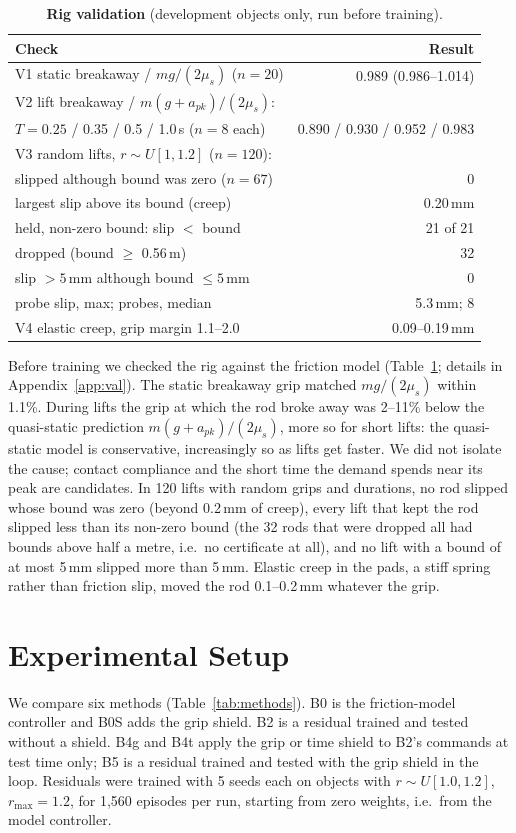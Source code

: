 \begin{table}[t]\centering\footnotesize
\caption{\textbf{Rig validation} (development objects only, run before training).}\label{tab:val}
\setlength{\tabcolsep}{3pt}
\begin{tabular}{@{}lr@{}}\toprule
Check & Result\\\midrule
V1 static breakaway / $mg/(2\mu_s)$ ($n=20$) & 0.989 (0.986--1.014)\\
V2 lift breakaway / $m(g+a_{pk})/(2\mu_s)$:&\\
\quad $T=0.25$ / 0.35 / 0.5 / 1.0\,s ($n=8$ each) & 0.890 / 0.930 / 0.952 / 0.983\\
V3 random lifts, $r\sim U[1,1.2]$ ($n=120$):&\\
\quad slipped although bound was zero ($n=67$) & 0\\
\quad largest slip above its bound (creep) & 0.20\,mm\\
\quad held, non-zero bound: slip $<$ bound & 21 of 21\\
\quad dropped (bound $\ge$ 0.56\,m) & 32\\
\quad slip $>5$\,mm although bound $\le5$\,mm & 0\\
\quad probe slip, max; probes, median & 5.3\,mm; 8\\
V4 elastic creep, grip margin 1.1--2.0 & 0.09--0.19\,mm\\\bottomrule
\end{tabular}\end{table}

 Before training we checked the rig against the friction model (Table~\ref{tab:val}; details in
Appendix~\ref{app:val}). The static breakaway grip matched $mg/(2\mu_s)$ within 1.1\%. During lifts the grip at which the rod
broke away was 2--11\% below the quasi-static prediction $m(g+a_{pk})/(2\mu_s)$, more so for short lifts: the quasi-static
model is conservative, increasingly so as lifts get faster. We did not isolate the cause; contact compliance and the
short time the demand spends near its peak are candidates. In
120 lifts with random grips and durations, no rod slipped whose bound was zero (beyond 0.2\,mm of creep), every lift that kept the
rod slipped less than its non-zero bound (the 32 rods that were dropped all had bounds above half a metre, i.e.\ no
certificate at all), and no lift with a bound of at most 5\,mm slipped more than 5\,mm. Elastic creep in the pads, a stiff
spring rather than friction slip, moved the rod 0.1--0.2\,mm whatever the grip.

\section{Experimental Setup}\label{sec:setup}
 We compare six methods (Table~\ref{tab:methods}). B0 is the friction-model controller and B0S adds the
grip shield. B2 is a residual trained and tested without a shield. B4g and B4t apply the grip or time shield to B2's
commands at test time only; B5 is a residual trained and tested with the grip shield in the loop. Residuals were trained
with 5 seeds each on objects with $r\sim U[1.0,1.2]$, $r_{\max}=1.2$, for 1{,}560 episodes per run, starting from zero
weights, i.e.\ from the model controller.


